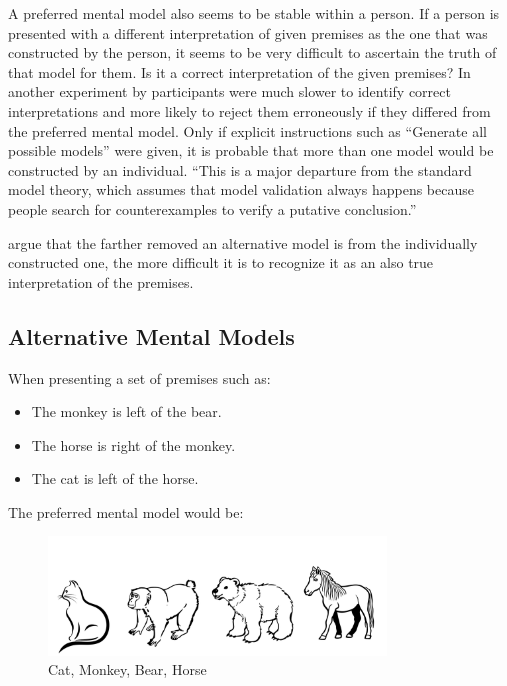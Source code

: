 \documentclass[hidelinks]{scrartcl}
\begin{document}
A preferred mental model also seems to be stable within a person. If a person is presented with a different interpretation of given premises as the one that was constructed by the person, it seems to be very difficult to ascertain the truth of that model for them. Is it a correct interpretation of the given premises? In another experiment by \cite{Ragni.2013} participants were much slower to identify correct interpretations and more likely to reject them erroneously if they differed from the preferred mental model. Only if explicit instructions such as ``Generate all possible models'' were given, it is probable that more than one model would be constructed by an individual. ``This is a major departure from the standard model theory, which assumes that model validation always happens because people search for counterexamples to verify a putative conclusion.'' \citep{Ragni.2013}

\cite{Ragni.2013} argue that the farther removed an alternative model is from the individually constructed one, the more difficult it is to recognize it as an also true interpretation of the premises.

\subsection{Alternative Mental Models} \label{section:alternative_mental_models}
When presenting a set of premises such as:

\begin{itemize}
\label{item:ambiguous}
\item The monkey is left of the bear.
\item The horse is right of the monkey.
\item The cat is left of the horse.
\end{itemize}

\noindent The preferred mental model would be:

\begin{figure}[H]
	\caption{Cat, Monkey, Bear, Horse}
	\label{fig:CMBH}
	\centering
	\includegraphics[width=0.8\textwidth]{Illustrations/animals_1.png}
\end{figure} 
\end{document}
